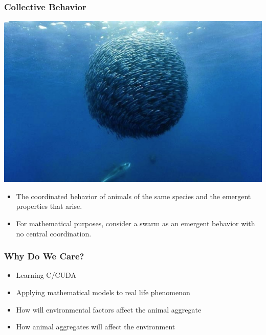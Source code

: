 \documentclass[xcolor=dvipsnames]{beamer}
\begin{document}
\begin{frame}
	\frametitle{Collective Behavior}
	\begin{center}
	\includegraphics[scale=0.05]{images/fish_schoo.jpg}
	\end{center}
	\begin{itemize}
		\item The coordinated behavior of animals of the same species and the emergent properties that arise.
		\pause
		\item For mathematical purposes, consider a swarm as an emergent behavior with no central coordination.
	\end{itemize}
\end{frame}

\begin{frame}
	\frametitle{Why Do We Care?}
	\begin{itemize}
		\item Learning C/CUDA
		\item Applying mathematical models to real life phenomenon
		\item How will environmental factors affect the animal aggregate
		\item How animal aggregates will affect the environment 
	\end{itemize}
\end{frame}
\end{document}
